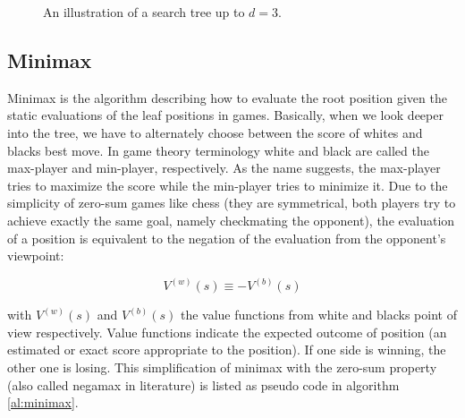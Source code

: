 \begin{figure}
\caption[Search tree]{An illustration of a search tree up to $d=3$.}
\label{fig:searchtree}
\end{figure}

\subsection{Minimax}
\label{subsec:minimax}
Minimax is the algorithm describing how to evaluate the root position given the static evaluations of the leaf positions in games. Basically, when we look deeper into the tree, we have to alternately choose between the score of whites and blacks best move. In game theory terminology white and black are called the max-player and min-player, respectively. As the name suggests, the max-player tries to maximize the score while the min-player tries to minimize it. Due to the simplicity of zero-sum games like chess (they are symmetrical, both players try to achieve exactly the same goal, namely checkmating the opponent), the evaluation of a position is equivalent to the negation of the evaluation from the opponent's viewpoint:

\begin{equation}
V^{(w)}(s)\equiv -V^{(b)}(s)
\label{eq:zerosum}
\end{equation}

with $V^{(w)}(s)$ and $V^{(b)}(s)$ the value functions from white and blacks point of view respectively. Value functions indicate the expected outcome of position (an estimated or exact score appropriate to the position).
If one side is winning, the other one is losing. This simplification of minimax with the zero-sum property (also called negamax in literature) is listed as pseudo code in algorithm \ref{al:minimax}.

